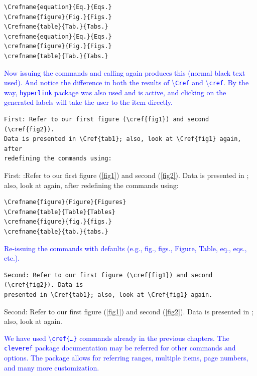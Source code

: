\documentclass[phd,showgrids]{ndsu-thesis-2022}
\newcommand\italk[1]{\textcolor{blue}{#1}}  %
\newcommand\cmd[1]{\textbackslash\texttt{#1}}  %
\newcommand\vb[1]{\textcolor{blue}{\texttt{#1}}}%
\begin{document}
\begin{verbatim}
\Crefname{equation}{Eq.}{Eqs.}
\Crefname{figure}{Fig.}{Figs.}
\Crefname{table}{Tab.}{Tabs.}
\crefname{equation}{Eq.}{Eqs.}
\crefname{figure}{Fig.}{Figs.}
\crefname{table}{Tab.}{Tabs.}
\end{verbatim}

\italk{Now issuing the commands and calling again produces this (normal black text used). And notice the difference in both the results of \cmd{Cref} and \cmd{cref}. By the way, \texttt{hyperlink} package was also used and is active, and clicking on the generated labels will take the user to the item directly. }


{\singlespacing
\begin{verbatim}
First: Refer to our first figure (\cref{fig1}) and second (\cref{fig2}). 
Data is presented in \Cref{tab1}; also, look at \Cref{fig1} again, after 
redefining the commands using:
\end{verbatim}
}
First: :Refer to our first figure (\cref{fig1}) and second (\cref{fig2}). Data is presented in ; also, look at  again, after redefining the commands using:

\begin{verbatim}
\Crefname{figure}{Figure}{Figures}
\Crefname{table}{Table}{Tables}
\crefname{figure}{fig.}{figs.}
\crefname{table}{tab.}{tabs.}
\end{verbatim}


\italk{Re-issuing the commands with defaults (e.g., fig., figs., Figure, Table, eq., eqs., etc.).}


{\singlespacing
\begin{verbatim}
Second: Refer to our first figure (\cref{fig1}) and second (\cref{fig2}). Data is 
presented in \Cref{tab1}; also, look at \Cref{fig1} again. 
\end{verbatim}
}
Second: Refer to our first figure (\cref{fig1}) and second (\cref{fig2}). Data is presented in ; also, look at  again. 

\italk{We have used \cmd{cref\{\ldots\}} commands already in the previous chapters. The \vb{cleveref} package documentation may be referred for other commands and options. The package allows for referring ranges, multiple items, page numbers, and many more customization.  
}
\end{document}
